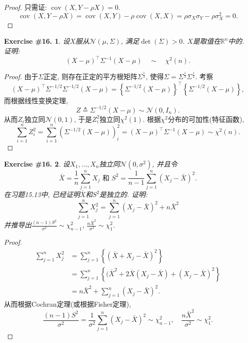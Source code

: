 \documentclass[UTF8, a4paper]{article}
\newtheorem{exercise}{Exercise \#16.}
\begin{document}
\begin{proof}
只需证: \(\operatorname{cov}(X, Y - \rho X) = 0\).
$$
\operatorname{cov}(X, Y - \rho X) = \operatorname{cov}(X, Y) - \rho \operatorname{cov}(X, X) = \rho \sigma_X \sigma_Y - \rho \sigma_X^2= 0.
$$
\end{proof}


\begin{framed}
\begin{exercise}
设\(X\)服从\(\mathcal{N}(\mu, \Sigma)\), 满足\(\det(\Sigma) > 0\).
\(X\)是取值在\(\mathbb{R}^n\)中的.
证明:
$$
(X-\mu)^\top \Sigma^{-1}(X-\mu)\quad  \sim \quad \chi^2(n) .
$$
\end{exercise}
\end{framed}

\begin{proof}
由于\(\Sigma\)正定, 则存在正定的平方根矩阵\(\Sigma^{\frac{1}{2}}\), 使得\(\Sigma = \Sigma^{\frac{1}{2}}\Sigma^{\frac{1}{2}}\).
考察 
$$
(X-\mu)^\top \Sigma^{-1/2} \Sigma^{-1/2}(X-\mu) = \left\{\Sigma^{-1/2}(X-\mu)\right\}^\top \left\{\Sigma^{-1/2}(X-\mu)\right\} ,
$$
而根据线性变换定理, 
$$
Z\triangleq \Sigma^{-1/2}(X-\mu) \sim \mathcal{N}(0, I_n).
$$
从而\(Z_i\)独立同\(\mathcal{N}(0, 1)\), 于是\(Z_i^2\)独立同\(\chi^2(1)\).
根据\(\chi^2\)分布的可加性(特征函数), 
$$
\sum_{i=1}^{n}Z_i^2 = \sum_{i=1}^{n}\left(\Sigma^{-1/2}(X-\mu)\right)_i^2 = (X-\mu)^\top \Sigma^{-1}(X-\mu) \sim \chi^2(n).
$$
\end{proof}


\begin{framed}
\begin{exercise}
设\(X_1, ..., X_n\)独立同\(\mathcal{N}(0, \sigma^2)\), 并且令
$$
\bar{X}=\frac{1}{n} \sum_{j=1}^n X_j \text { 和 } S^2=\frac{1}{n-1} \sum_{j=1}^n\left(X_j-\bar{X}\right)^2 .
$$
在习题15.13中, 已经证明\(\bar{X}\)和\(S^2\)是独立的.
证明: $$
\sum_{j=1}^n X_j^2=\sum_{j=1}^n\left(X_j-\bar{X}\right)^2+n \bar{X}^2
$$
并推导出\(\frac{(n-1)S^2}{\sigma^2}\sim \chi_{n-1}^2\), \(\frac{n \bar{X}^2}{\sigma^2} \sim \chi_1^2\).
\end{exercise}
\end{framed}


\begin{proof}
$$
\begin{aligned}
    \sum_{j=1}^n X_j^2 &= \sum_{j=1}^n \left\{(\bar{X} + X_j - \bar{X})^2\right\} \\
    &= \sum_{j=1}^n \left\{(\bar{X}^2 + 2\bar{X}(X_j - \bar{X}) + (X_j - \bar{X})^2\right\} \\
    &= n\bar{X}^2 + \sum_{j=1}^n (X_j - \bar{X})^2.
\end{aligned}
$$
从而根据Cochran定理(或根据Fisher定理),
$$
\frac{(n-1)S^2}{\sigma^2} = \frac{1}{\sigma^2}\sum_{j=1}^n (X_j - \bar{X})^2 \sim \chi_{n-1}^2, \quad \frac{n\bar{X}^2}{\sigma^2} \sim \chi_1^2.
$$
\end{proof}
\end{document}
